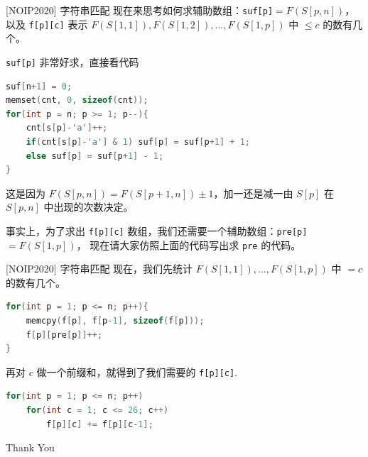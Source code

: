 \documentclass{beamer}
\begin{document}
\begin{frame}[fragile]{[NOIP2020] 字符串匹配}
    \footnotesize
    现在来思考如何求辅助数组：\verb|suf[p]|$=F(S[p,n])$，以及
    \verb|f[p][c]| 表示 $F(S[1,1]),F(S[1,2]),...,F(S[1,p])$ 中 $\leq c$ 的数有几个。

    \vspace{1em}\pause
    \verb|suf[p]| 非常好求，直接看代码
    \begin{lstlisting}[language=c++]
suf[n+1] = 0;
memset(cnt, 0, sizeof(cnt));
for(int p = n; p >= 1; p--){
    cnt[s[p]-'a']++;
    if(cnt[s[p]-'a'] & 1) suf[p] = suf[p+1] + 1;
    else suf[p] = suf[p+1] - 1;
}
    \end{lstlisting}
    这是因为 $F(S[p,n])=F(S[p+1,n])\pm 1$，加一还是减一由 $S[p]$ 在 $S[p,n]$ 中出现的次数决定。

    \vspace{1em}\pause
    事实上，为了求出 \verb|f[p][c]| 数组，我们还需要一个辅助数组：\verb|pre[p]|$=F(S[1,p])$，
    现在请大家仿照上面的代码写出求 \verb|pre| 的代码。
\end{frame}

\begin{frame}[fragile]{[NOIP2020] 字符串匹配}
    \footnotesize
    现在，我们先统计 $F(S[1,1]),...,F(S[1,p])$ 中 $=c$ 的数有几个。
    \begin{lstlisting}[language=c++]
for(int p = 1; p <= n; p++){
    memcpy(f[p], f[p-1], sizeof(f[p]));
    f[p][pre[p]]++;
}
    \end{lstlisting}

    \vspace{1em}\pause
    再对 $c$ 做一个前缀和，就得到了我们需要的 \verb|f[p][c]|.
    \begin{lstlisting}[language=c++]
for(int p = 1; p <= n; p++)
    for(int c = 1; c <= 26; c++)
        f[p][c] += f[p][c-1];
    \end{lstlisting}
\end{frame}

\begin{frame}
    \begin{center}
        {\Huge\calligra Thank You}
    \end{center}
\end{frame}
\end{document}
